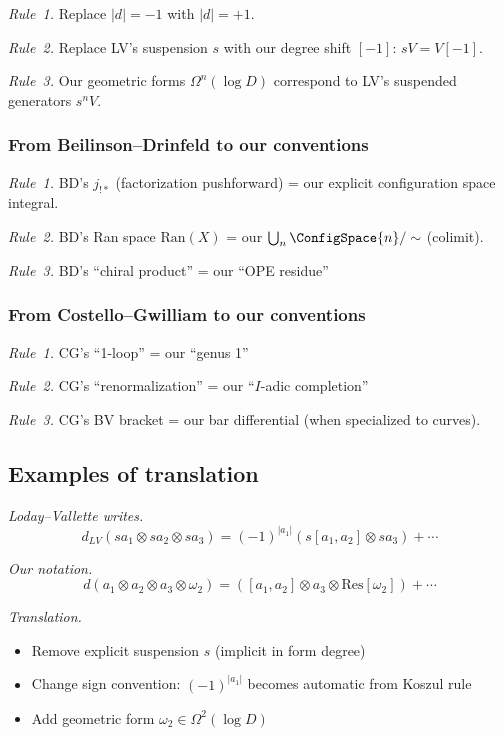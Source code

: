 \emph{Rule~1.} Replace $|d| = -1$ with $|d| = +1$.

\emph{Rule~2.} Replace LV's suspension $s$ with our degree shift $[-1]$: $sV = V[-1]$.

\emph{Rule~3.} Our geometric forms $\Omega^n(\log D)$ correspond to LV's suspended generators $s^n V$.

\subsubsection{From Beilinson--Drinfeld to our conventions}

\emph{Rule~1.} BD's $j_{!*}$ (factorization pushforward) = our explicit configuration space integral.

\emph{Rule~2.} BD's Ran space $\text{Ran}(X)$ = our $\bigcup_n \ConfigSpace{n} / \sim$ (colimit).

\emph{Rule~3.} BD's ``chiral product'' = our ``OPE residue''

\subsubsection{From Costello--Gwilliam to our conventions}

\emph{Rule~1.} CG's ``1-loop'' = our ``genus 1''

\emph{Rule~2.} CG's ``renormalization'' = our ``$I$-adic completion''

\emph{Rule~3.} CG's BV bracket = our bar differential (when specialized to curves).

\subsection{Examples of translation}

\begin{example}
\emph{Loday--Vallette writes.}
\[d_{LV}(s a_1 \otimes s a_2 \otimes s a_3) = (-1)^{|a_1|} (s[a_1, a_2] \otimes s a_3) + \cdots\]

\emph{Our notation.}
\[d(a_1 \otimes a_2 \otimes a_3 \otimes \omega_2) = ([a_1, a_2] \otimes a_3 \otimes \text{Res}[\omega_2]) + \cdots\]

\emph{Translation.}
\begin{itemize}
\item Remove explicit suspension $s$ (implicit in form degree)
\item Change sign convention: $(-1)^{|a_1|}$ becomes automatic from Koszul rule
\item Add geometric form $\omega_2 \in \Omega^2(\log D)$
\end{itemize}
\end{example}

